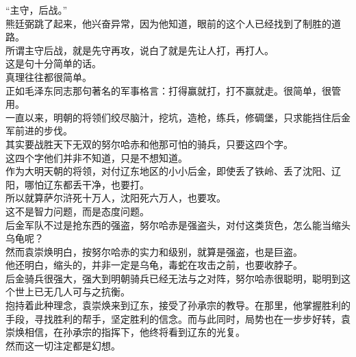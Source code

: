 \begin{multicols}{\theparacolNo}
“主守，后战。”\\

熊廷弼跳了起来，他兴奋异常，因为他知道，眼前的这个人已经找到了制胜的道路。\\

所谓主守后战，就是先守再攻，说白了就是先让人打，再打人。\\

这是句十分简单的话。\\

真理往往都很简单。\\

正如毛泽东同志那句著名的军事格言：打得赢就打，打不赢就走。很简单，很管用。\\

一直以来，明朝的将领们绞尽脑汁，挖坑，造枪，练兵，修碉堡，只求能挡住后金军前进的步伐。\\

其实要战胜天下无双的努尔哈赤和他那可怕的骑兵，只要这四个字。\\

这四个字他们并非不知道，只是不想知道。\\

作为大明天朝的将领，对付辽东地区的小小后金，即使丢了铁岭、丢了沈阳、辽阳，哪怕辽东都丢干净，也要打。\\

所以就算萨尔浒死十万人，沈阳死六万人，也要攻。\\

这不是智力问题，而是态度问题。\\

后金军队不过是抢东西的强盗，努尔哈赤是强盗头，对付这类货色，怎么能当缩头乌龟呢？\\

然而袁崇焕明白，按努尔哈赤的实力和级别，就算是强盗，也是巨盗。\\

他还明白，缩头的，并非一定是乌龟，毒蛇在攻击之前，也要收脖子。\\

后金骑兵很强大，强大到明朝骑兵已经无法与之对阵，努尔哈赤很聪明，聪明到这个世上已无几人可与之抗衡。\\

抱持着此种理念，袁崇焕来到辽东，接受了孙承宗的教导。在那里，他掌握胜利的手段，寻找胜利的帮手，坚定胜利的信念。而与此同时，局势也在一步步好转，袁崇焕相信，在孙承宗的指挥下，他终将看到辽东的光复。\\

然而这一切注定都是幻想。\\


\end{multicols}
